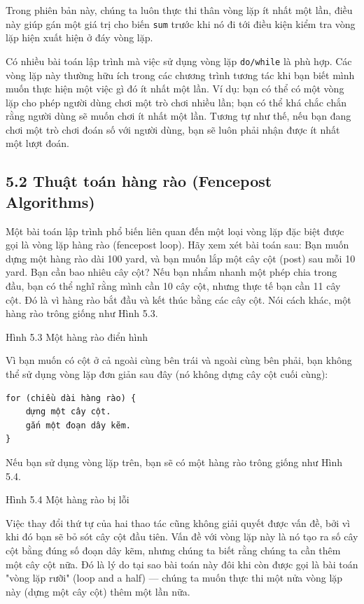 Trong phiên bản này, chúng ta luôn thực thi thân vòng lặp ít nhất một lần, điều này giúp gán một giá trị cho biến \texttt{sum} trước khi nó đi tới điều kiện kiểm tra vòng lặp hiện xuất hiện ở đáy vòng lặp.

Có nhiều bài toán lập trình mà việc sử dụng vòng lặp \texttt{do/while} là phù hợp. Các vòng lặp này thường hữu ích trong các chương trình tương tác khi bạn biết mình muốn thực hiện một việc gì đó ít nhất một lần. Ví dụ: bạn có thể có một vòng lặp cho phép người dùng chơi một trò chơi nhiều lần; bạn có thể khá chắc chắn rằng người dùng sẽ muốn chơi ít nhất một lần. Tương tự như thế, nếu bạn đang chơi một trò chơi đoán số với người dùng, bạn sẽ luôn phải nhận được ít nhất một lượt đoán.

\subsection*{5.2 Thuật toán hàng rào (Fencepost Algorithms)}

Một bài toán lập trình phổ biến liên quan đến một loại vòng lặp đặc biệt được gọi là vòng lặp hàng rào (fencepost loop). Hãy xem xét bài toán sau: Bạn muốn dựng một hàng rào dài 100 yard, và bạn muốn lắp một cây cột (post) sau mỗi 10 yard. Bạn cần bao nhiêu cây cột? Nếu bạn nhẩm nhanh một phép chia trong đầu, bạn có thể nghĩ rằng mình cần 10 cây cột, nhưng thực tế bạn cần 11 cây cột. Đó là vì hàng rào bắt đầu và kết thúc bằng các cây cột. Nói cách khác, một hàng rào trông giống như Hình 5.3.

Hình 5.3 Một hàng rào điển hình

Vì bạn muốn có cột ở cả ngoài cùng bên trái và ngoài cùng bên phải, bạn không thể sử dụng vòng lặp đơn giản sau đây (nó không dựng cây cột cuối cùng):

\begin{verbatim}
for (chiều dài hàng rào) {
    dựng một cây cột.
    gắn một đoạn dây kẽm.
}
\end{verbatim}

Nếu bạn sử dụng vòng lặp trên, bạn sẽ có một hàng rào trông giống như Hình 5.4.

Hình 5.4 Một hàng rào bị lỗi

Việc thay đổi thứ tự của hai thao tác cũng không giải quyết được vấn đề, bởi vì khi đó bạn sẽ bỏ sót cây cột đầu tiên. Vấn đề với vòng lặp này là nó tạo ra số cây cột bằng đúng số đoạn dây kẽm, nhưng chúng ta biết rằng chúng ta cần thêm một cây cột nữa. Đó là lý do tại sao bài toán này đôi khi còn được gọi là bài toán "vòng lặp rưỡi" (loop and a half) — chúng ta muốn thực thi một nửa vòng lặp này (dựng một cây cột) thêm một lần nữa.